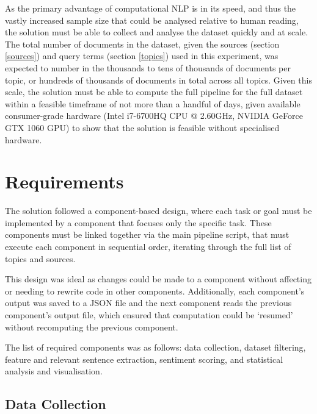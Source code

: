 \documentclass{report}
\begin{document}
As the primary advantage of computational NLP is in its speed, and thus the vastly increased sample size that could be analysed relative to human reading, the solution must be able to collect and analyse the dataset quickly and at scale.
The total number of documents in the dataset, given the sources (section \ref{sources}) and query terms (section \ref{topics}) used in this experiment, was expected to number in the thousands to tens of thousands of documents per topic, or hundreds of thousands of documents in total across all topics.
Given this scale, the solution must be able to compute the full pipeline for the full dataset within a feasible timeframe of not more than a handful of days, given available consumer-grade hardware (Intel i7-6700HQ CPU @ 2.60GHz, NVIDIA GeForce GTX 1060 GPU) to show that the solution is feasible without specialised hardware.

\section{Requirements} \label{Requirements}

The solution followed a component-based design, where each task or goal must be implemented by a component that focuses only the specific task.
These components must be linked together via the main pipeline script, that must execute each component in sequential order, iterating through the full list of topics and sources.

This design was ideal as changes could be made to a component without affecting or needing to rewrite code in other components.
Additionally, each component's output was saved to a JSON \cite{rfc8259} file and the next component reads the previous component's output file, which ensured that computation could be `resumed' without recomputing the previous component.

The list of required components was as follows: data collection, dataset filtering, feature and relevant sentence extraction, sentiment scoring, and statistical analysis and visualisation.


\subsection{Data Collection} \label{req-data-collection}  %
\end{document}
